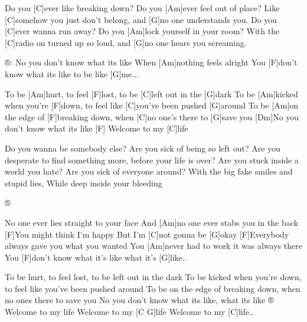
Do you [C]ever like breaking down?
Do you [Am]ever feel out of place?
Like [C]somehow you just don't belong,
and [G]no one understands you.
Do you [C]ever wanna run away?
Do you [Am]lock yourself in your room?
With the [C]radio on turned up so loud,
and [G]no one hears you screaming.

®: No you don't know what its like
When [Am]nothing feels alright
You [F]don't know what its like to be like [G]me...

To be [Am]hurt, to feel [F]lost, to be [C]left out in the [G]dark
To be [Am]kicked when you're [F]down, to feel like [C]you've been pushed [G]around
To be [Am]on the edge of [F]breaking down, when [C]no one's there to [G]save you
[Dm]No you don't know what its like
[F] Welcome to my [C]life

Do you wanna be somebody else?
Are you sick of being so left out?
Are you desperate to find something more,
before your life is over?
Are you stuck inside a world you hate?
Are you sick of everyone around?
With the big fake smiles and stupid lies,
While deep inside your bleeding

® 

No one ever lies straight to your face
And [Am]no one ever stabs you in the back
[F]You might think I'm happy
But I'm [C]not gonna be [G]okay
[F]Everybody always gave you what you wanted
You [Am]never had to work it was always there
You [F]don't know what it's like what it's [G]like..

To be hurt, to feel lost, to be left out in the dark
To be kicked when you're down, to feel like you've been pushed around
To be on the edge of breaking down, when no ones there to save you
No you don't know what its like, what its like
®
Welcome to my life
Welcome to my [C G]life
Welcome to my [C]life..

